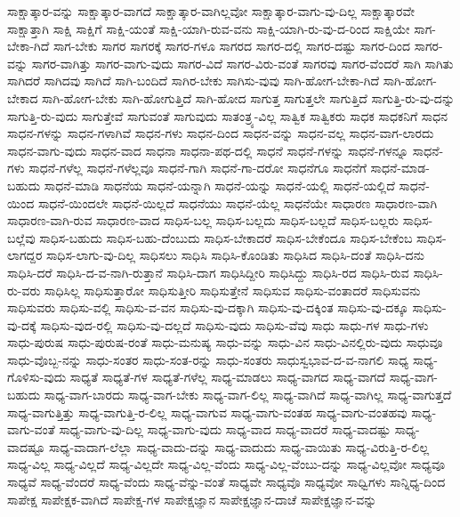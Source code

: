 {ಸಾಕ್ಷಾತ್ಕಾರ-ವನ್ನು
ಸಾಕ್ಷಾತ್ಕಾರ-ವಾಗದೆ
ಸಾಕ್ಷಾತ್ಕಾರ-ವಾಗಿಲ್ಲವೋ
ಸಾಕ್ಷಾತ್ಕಾರ-ವಾಗು-ವು-ದಿಲ್ಲ
ಸಾಕ್ಷಾತ್ಕಾರವೇ
ಸಾಕ್ಷಾತ್ತಾಗಿ
ಸಾಕ್ಷಿ
ಸಾಕ್ಷಿಗೆ
ಸಾಕ್ಷಿ-ಯಂತೆ
ಸಾಕ್ಷಿ-ಯಾಗಿ-ರುವ-ವನು
ಸಾಕ್ಷಿ-ಯಾಗಿ-ರು-ವು-ದ-ರಿಂದ
ಸಾಕ್ಷಿಯೇ
ಸಾಗ-ಬೇಕಾ-ಗಿದೆ
ಸಾಗ-ಬೇಕು
ಸಾಗರ
ಸಾಗರಕ್ಕೆ
ಸಾಗರ-ಗಳೂ
ಸಾಗರದ
ಸಾಗರ-ದಲ್ಲಿ
ಸಾಗರ-ದಷ್ಟು
ಸಾಗರ-ದಿಂದ
ಸಾಗರ-ವನ್ನು
ಸಾಗರ-ವಾಗಿತ್ತು
ಸಾಗರ-ವಾಗು-ವುದು
ಸಾಗರ-ವಿದೆ
ಸಾಗರ-ವಿರು-ವಂತೆ
ಸಾಗರವು
ಸಾಗರ-ವೆಂದರೆ
ಸಾಗಿ
ಸಾಗಿತು
ಸಾಗಿದರೆ
ಸಾಗಿದವು
ಸಾಗಿದೆ
ಸಾಗಿ-ಬಂದಿದೆ
ಸಾಗಿರ-ಬೇಕು
ಸಾಗಿಸು-ವುವು
ಸಾಗಿ-ಹೋಗ-ಬೇಕಾ-ಗಿದೆ
ಸಾಗಿ-ಹೋಗ-ಬೇಕಾದ
ಸಾಗಿ-ಹೋಗ-ಬೇಕು
ಸಾಗಿ-ಹೋಗುತ್ತಿದೆ
ಸಾಗಿ-ಹೋದ
ಸಾಗುತ್ತ
ಸಾಗುತ್ತಲೇ
ಸಾಗುತ್ತಿದೆ
ಸಾಗುತ್ತಿ-ರು-ವು-ದನ್ನು
ಸಾಗುತ್ತಿ-ರು-ವುದು
ಸಾಗುತ್ತೇವೆ
ಸಾಗುವಂತೆ
ಸಾಗುವುದು
ಸಾತಂತ್ರ್ಯ-ವಿಲ್ಲ
ಸಾತ್ವಿಕ
ಸಾತ್ವಿಕರು
ಸಾಧಕ
ಸಾಧಕನಿಗೆ
ಸಾಧನ
ಸಾಧನ-ಗಳನ್ನು
ಸಾಧನ-ಗಳಾಗಿವೆ
ಸಾಧನ-ಗಳು
ಸಾಧನ-ದಿಂದ
ಸಾಧನ-ವನ್ನು
ಸಾಧನ-ವಲ್ಲ
ಸಾಧನ-ವಾಗ-ಲಾರದು
ಸಾಧನ-ವಾಗು-ವುದು
ಸಾಧನ-ವಾದ
ಸಾಧನಾ
ಸಾಧನಾ-ಪಥ-ದಲ್ಲಿ
ಸಾಧನೆ
ಸಾಧನೆ-ಗಳನ್ನು
ಸಾಧನೆ-ಗಳನ್ನೂ
ಸಾಧನೆ-ಗಳು
ಸಾಧನೆ-ಗಳೆಲ್ಲ
ಸಾಧನೆ-ಗಳೆಲ್ಲವೂ
ಸಾಧನೆ-ಗಾಗಿ
ಸಾಧನೆ-ಗಾ-ದರೋ
ಸಾಧನೆಗೂ
ಸಾಧನೆಗೆ
ಸಾಧನೆ-ಮಾಡ-ಬಹುದು
ಸಾಧನೆ-ಮಾಡಿ
ಸಾಧನೆಯ
ಸಾಧನೆ-ಯನ್ನಾಗಿ
ಸಾಧನೆ-ಯನ್ನು
ಸಾಧನೆ-ಯಲ್ಲಿ
ಸಾಧನೆ-ಯಲ್ಲಿದೆ
ಸಾಧನೆ-ಯಿಂದ
ಸಾಧನೆ-ಯಿಂದಲೇ
ಸಾಧನೆ-ಯಿಲ್ಲದೆ
ಸಾಧನೆಯು
ಸಾಧನೆ-ಯೆಲ್ಲ
ಸಾಧನೆಯೇ
ಸಾಧಾರಣ
ಸಾಧಾರಣ-ವಾಗಿ
ಸಾಧಾರಣ-ವಾಗಿ-ರುವ
ಸಾಧಾರಣ-ವಾದ
ಸಾಧಿಸ-ಬಲ್ಲ
ಸಾಧಿಸ-ಬಲ್ಲದು
ಸಾಧಿಸ-ಬಲ್ಲದೆ
ಸಾಧಿಸ-ಬಲ್ಲರು
ಸಾಧಿಸ-ಬಲ್ಲೆವು
ಸಾಧಿಸ-ಬಹುದು
ಸಾಧಿಸ-ಬಹು-ದೆಂಬುದು
ಸಾಧಿಸ-ಬೇಕಾದರೆ
ಸಾಧಿಸ-ಬೇಕೆಂದೂ
ಸಾಧಿಸ-ಬೇಕೆಂಬ
ಸಾಧಿಸ-ಲಾಗದ್ದರ
ಸಾಧಿಸ-ಲಾಗು-ವು-ದಿಲ್ಲ
ಸಾಧಿಸಲು
ಸಾಧಿಸಿ
ಸಾಧಿಸಿ-ಕೊಂಡಿತು
ಸಾಧಿಸಿದ
ಸಾಧಿಸಿ-ದಂತೆ
ಸಾಧಿಸಿ-ದನು
ಸಾಧಿಸಿ-ದರೆ
ಸಾಧಿಸಿ-ದ-ವ-ನಾಗಿ-ರುತ್ತಾನೆ
ಸಾಧಿಸಿ-ದಾಗ
ಸಾಧಿಸಿದ್ದೀರಿ
ಸಾಧಿಸಿದ್ದು
ಸಾಧಿಸಿ-ರದ
ಸಾಧಿಸಿ-ರುವ
ಸಾಧಿಸಿ-ರು-ವರು
ಸಾಧಿಸಿಲ್ಲ
ಸಾಧಿಸುತ್ತಾರೋ
ಸಾಧಿಸುತ್ತೀರಿ
ಸಾಧಿಸುತ್ತೇನೆ
ಸಾಧಿಸುವ
ಸಾಧಿಸು-ವಂತಾದರೆ
ಸಾಧಿಸುವನು
ಸಾಧಿಸುವರು
ಸಾಧಿಸು-ವಲ್ಲಿ
ಸಾಧಿಸು-ವ-ವನ
ಸಾಧಿಸು-ವು-ದಕ್ಕಾಗಿ
ಸಾಧಿಸು-ವು-ದಕ್ಕಿಂತ
ಸಾಧಿಸು-ವು-ದಕ್ಕೂ
ಸಾಧಿಸು-ವು-ದಕ್ಕೆ
ಸಾಧಿಸು-ವುದ-ರಲ್ಲಿ
ಸಾಧಿಸು-ವು-ದಲ್ಲದೆ
ಸಾಧಿಸು-ವುದು
ಸಾಧಿಸು-ವೆವು
ಸಾಧು
ಸಾಧು-ಗಳ
ಸಾಧು-ಗಳು
ಸಾಧು-ಪುರುಷ
ಸಾಧು-ಪುರುಷ-ರಂತೆ
ಸಾಧು-ಮನುಷ್ಯ
ಸಾಧು-ವನ್ನು
ಸಾಧು-ವಿನ
ಸಾಧು-ವಿನಲ್ಲಿರು-ವುದು
ಸಾಧುವೂ
ಸಾಧು-ವೊಬ್ಬ-ನನ್ನು
ಸಾಧು-ಸಂತರ
ಸಾಧು-ಸಂತ-ರನ್ನು
ಸಾಧು-ಸಂತರು
ಸಾಧುಸ್ವಭಾವ-ದ-ವ-ನಾಗಲಿ
ಸಾಧ್ಯ
ಸಾಧ್ಯ-ಗೊಳಿಸು-ವುದು
ಸಾಧ್ಯತೆ
ಸಾಧ್ಯತೆ-ಗಳ
ಸಾಧ್ಯತೆ-ಗಳೆಲ್ಲ
ಸಾಧ್ಯ-ಮಾಡಲು
ಸಾಧ್ಯ-ವಾಗದ
ಸಾಧ್ಯ-ವಾಗದೆ
ಸಾಧ್ಯ-ವಾಗ-ಬಹುದು
ಸಾಧ್ಯ-ವಾಗ-ಬಾರದು
ಸಾಧ್ಯ-ವಾಗ-ಬೇಕು
ಸಾಧ್ಯ-ವಾಗ-ಲಿಲ್ಲ
ಸಾಧ್ಯ-ವಾಗಿದೆ
ಸಾಧ್ಯ-ವಾಗಿಲ್ಲ
ಸಾಧ್ಯ-ವಾಗುತ್ತದೆ
ಸಾಧ್ಯ-ವಾಗುತ್ತಿತ್ತು
ಸಾಧ್ಯ-ವಾಗುತ್ತಿ-ರ-ಲಿಲ್ಲ
ಸಾಧ್ಯ-ವಾಗುವ
ಸಾಧ್ಯ-ವಾಗು-ವಂತಹ
ಸಾಧ್ಯ-ವಾಗು-ವಂತಹವು
ಸಾಧ್ಯ-ವಾಗು-ವಂತೆ
ಸಾಧ್ಯ-ವಾಗು-ವು-ದಿಲ್ಲ
ಸಾಧ್ಯ-ವಾಗು-ವುದು
ಸಾಧ್ಯ-ವಾದ
ಸಾಧ್ಯ-ವಾದರೆ
ಸಾಧ್ಯ-ವಾದಷ್ಟು
ಸಾಧ್ಯ-ವಾದಷ್ಟೂ
ಸಾಧ್ಯ-ವಾದಾಗ-ಲೆಲ್ಲಾ
ಸಾಧ್ಯ-ವಾದು-ದನ್ನು
ಸಾಧ್ಯ-ವಾದುದು
ಸಾಧ್ಯ-ವಾಯಿತು
ಸಾಧ್ಯ-ವಿರುತ್ತಿ-ರ-ಲಿಲ್ಲ
ಸಾಧ್ಯ-ವಿಲ್ಲ
ಸಾಧ್ಯ-ವಿಲ್ಲದೆ
ಸಾಧ್ಯ-ವಿಲ್ಲದೇ
ಸಾಧ್ಯ-ವಿಲ್ಲ-ವೆಂದು
ಸಾಧ್ಯ-ವಿಲ್ಲ-ವೆಂಬು-ದನ್ನು
ಸಾಧ್ಯ-ವಿಲ್ಲವೋ
ಸಾಧ್ಯವೂ
ಸಾಧ್ಯವೆ
ಸಾಧ್ಯ-ವೆಂದರೆ
ಸಾಧ್ಯ-ವೆಂದು
ಸಾಧ್ಯ-ವೆನ್ನು-ವಂತೆ
ಸಾಧ್ಯವೇ
ಸಾಧ್ಯವೊ
ಸಾಧ್ಯವೋ
ಸಾಧ್ವಿಗಳು
ಸಾನ್ನಿಧ್ಯ-ದಿಂದ
ಸಾಪೇಕ್ಷ
ಸಾಪೇಕ್ಷಕ-ವಾಗಿದೆ
ಸಾಪೇಕ್ಷ-ಗಳ
ಸಾಪೇಕ್ಷಜ್ಞಾನ
ಸಾಪೇಕ್ಷಜ್ಞಾನ-ದಾಚೆ
ಸಾಪೇಕ್ಷಜ್ಞಾನ-ವನ್ನು
}
